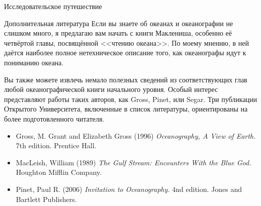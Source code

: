 \begin{chapter}{Исследовательское путешествие}
\begin{section}{Дополнительная литература}
Если вы знаете об океанах и океанографии не слишком много, я предлагаю 
вам начать с книги Маклениша, особенно её четвёртой главы, посвящённой 
<<чтению океана>>. 
По моему мнению, в ней даётся наиболее полное нетехническое описание того, 
как океанографы идут к пониманию океана.
%

Вы также можете извлечь немало полезных сведений из соответствующих глав любой 
океанографической книги начального уровня. Особый интерес представляют работы 
таких авторов, как Gross, Pinet, или Segar. Три публикации Открытого 
Университета, включенные в список литературы, ориентированы на более 
подготовленного читателя. 
%

\begin{itemize}
\item
Gross, M. Grant and Elizabeth Gross (1996) \textit{Oceanography, 
A View of Earth.} 7th edition. Prentice Hall.
%

\item
MacLeish, William (1989) \textit{The Gulf Stream: Encounters With the Blue God.}
Houghton Mifflin Company. 
%

\item
Pinet, Paul R. (2006) \textit{Invitation to Oceanography.} 4nd edition.
Jones and Bartlett Publishers.
%


\end{itemize}
\end{section}
\end{chapter}
